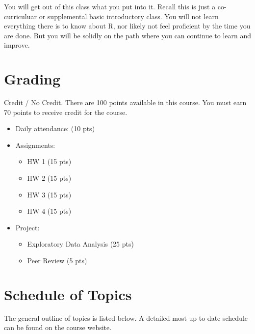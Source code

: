 \documentclass[
  11pt,
]{article}
\providecommand{\tightlist}{%
  \setlength{\itemsep}{0pt}\setlength{\parskip}{0pt}}
\begin{document}
You will get out of this class what you put into it. Recall this is just
a co-curriculuar or supplemental basic introductory class. You will not
learn everything there is to know about R, nor likely not feel
proficient by the time you are done. But you will be solidly on the path
where you can continue to learn and improve.

\hypertarget{grading}{%
\section{Grading}\label{grading}}

Credit / No Credit. There are 100 points available in this course. You
must earn 70 points to receive credit for the course.

\begin{itemize}
\tightlist
\item
  Daily attendance: (10 pts)
\item
  Assignments:

  \begin{itemize}
  \tightlist
  \item
    HW 1 (15 pts)
  \item
    HW 2 (15 pts)
  \item
    HW 3 (15 pts)
  \item
    HW 4 (15 pts)
  \end{itemize}
\item
  Project:

  \begin{itemize}
  \tightlist
  \item
    Exploratory Data Analysis (25 pts)
  \item
    Peer Review (5 pts)
  \end{itemize}
\end{itemize}

\hypertarget{schedule-of-topics}{%
\section{Schedule of Topics}\label{schedule-of-topics}}

The general outline of topics is listed below. A detailed most up to
date schedule can be found on the course website.
\end{document}
